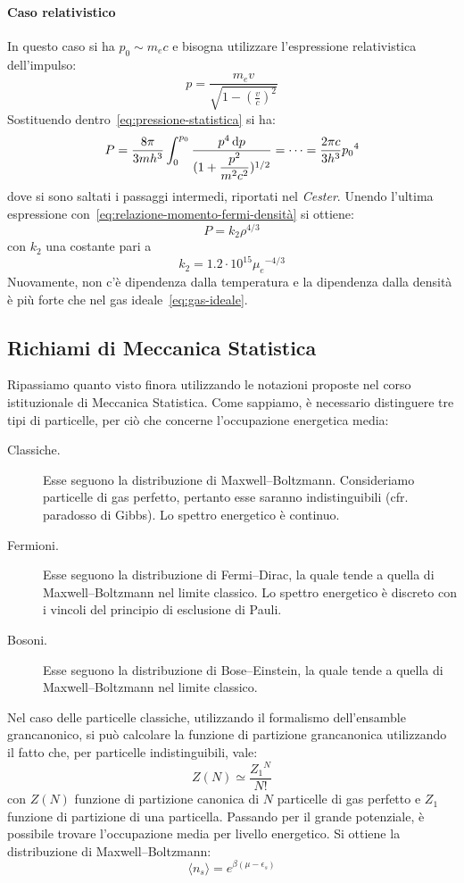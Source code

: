 \paragraph{Caso relativistico}
In questo caso si ha $p_0 \sim m_e c$ e bisogna utilizzare l'espressione relativistica dell'impulso:
\[
p= \dfrac{m_e v}{\sqrt{1- (\frac{v}{c})^2}}
\]
Sostituendo dentro~\eqref{eq:pressione-statistica} si ha:
\[
P = \dfrac{8\pi}{3mh^3} \int_0^{p_0} \dfrac{p^4 \mathop{\mathrm{{}d}}\mathopen{} p}{(1 + \dfrac{p^2}{m^2c^2})^{1/2}} = \dots = \dfrac{2\pi c}{3h^3}{p_0}^4
\]
dove si sono saltati i passaggi intermedi, riportati nel \emph{Cester}. Unendo l'ultima espressione con~\eqref{eq:relazione-momento-fermi-densità} si ottiene:
\begin{equation}\label{eq:pressione-degenerazione-relativistica}
    P = k_2 \rho^{4/3}
\end{equation}
con $k_2$ una costante pari a
\[
k_2 = 1.2 \cdot 10^{15} {\mu_e}^{-4/3}
\]
Nuovamente, non c'è dipendenza dalla temperatura e la dipendenza dalla densità è più forte che nel gas ideale~\eqref{eq:gas-ideale}.

\subsection{Richiami di Meccanica Statistica}
Ripassiamo quanto visto finora utilizzando le notazioni proposte nel corso istituzionale di Meccanica Statistica. Come sappiamo, è necessario distinguere tre tipi di particelle, per ciò che concerne l'occupazione energetica media:
\begin{description}
\item[Classiche.] Esse seguono la distribuzione di Maxwell--Boltzmann. Consideriamo particelle di gas perfetto, pertanto esse saranno indistinguibili (cfr. paradosso di Gibbs). Lo spettro energetico è continuo.
\item[Fermioni.] Esse seguono la distribuzione di Fermi--Dirac, la quale tende a quella di Maxwell--Boltzmann nel limite classico. Lo spettro energetico è discreto con i vincoli del principio di esclusione di Pauli. 
\item[Bosoni.] Esse seguono la distribuzione di Bose--Einstein, la quale tende a quella di Maxwell--Boltzmann nel limite classico.
\end{description}

Nel caso delle particelle classiche, utilizzando il formalismo dell'ensamble grancanonico, si può calcolare la funzione di partizione grancanonica utilizzando il fatto che, per particelle indistinguibili, vale:
\[
Z(N) \simeq \frac{{Z_1}^N}{N!}
\]
con $Z(N)$ funzione di partizione canonica di $N$ particelle di gas perfetto e $Z_1$ funzione di partizione di una particella. Passando per il grande potenziale, è possibile trovare l'occupazione media per livello energetico. Si ottiene la distribuzione di Maxwell--Boltzmann:\
\begin{equation}
    \langle n_s  \rangle = e^{\beta(\mu - \epsilon_s)} 
\end{equation}

